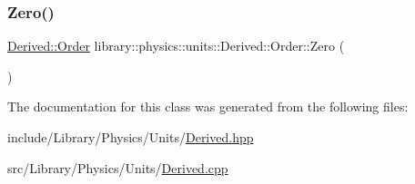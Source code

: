 \mbox{\label{classlibrary_1_1physics_1_1units_1_1_derived_1_1_order_ad001256340bff8a9c55156f9c45d4969}} 
\subsubsection{\texorpdfstring{Zero()}{Zero()}}
{\footnotesize\ttfamily \hyperlink{classlibrary_1_1physics_1_1units_1_1_derived_1_1_order}{Derived\+::\+Order} library\+::physics\+::units\+::\+Derived\+::\+Order\+::\+Zero (\begin{DoxyParamCaption}{ }\end{DoxyParamCaption})\hspace{0.3cm}{\ttfamily [static]}}



The documentation for this class was generated from the following files\+:\begin{DoxyCompactItemize}
\item 
include/\+Library/\+Physics/\+Units/\hyperlink{_derived_8hpp}{Derived.\+hpp}\item 
src/\+Library/\+Physics/\+Units/\hyperlink{_derived_8cpp}{Derived.\+cpp}\end{DoxyCompactItemize}
